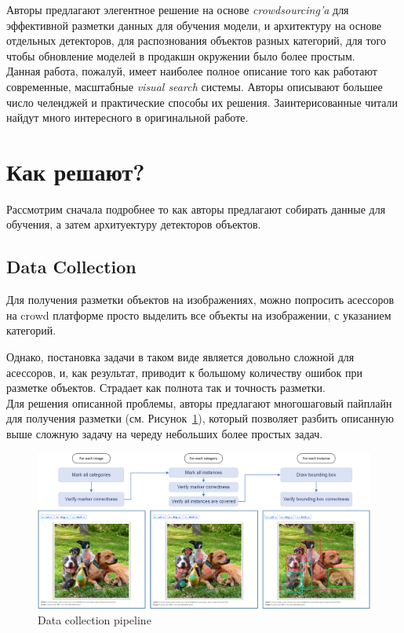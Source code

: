 Авторы предлагают элегентное решение на основе \textit{crowdsourcing'a} для эффективной разметки данных для обучения модели, и архитектуру на основе  отдельных детекторов, для распознования объектов разных категорий, для того чтобы обновление моделей в продакшн окружении было более простым. \\

Данная работа, пожалуй, имеет наиболее полное описание того как работают современные, масштабные \textit{visual search} системы.
Авторы описывают большее число челенджей и практические способы их решения.
Заинтерисованные читали найдут много интересного в оригинальной работе.

\section*{Как решают?}

Рассмотрим сначала подробнее то как авторы предлагают собирать данные для обучения, а затем архитуектуру детекторов объектов.

\subsection*{Data Collection}

Для получения разметки объектов на изображениях, можно попросить асессоров на crowd платформе просто выделить все объекты на изображении, с указанием категорий.

Однако, постановка задачи в таком виде является довольно сложной для асессоров, и, как результат, приводит к большому количеству ошибок при разметке объектов.
Страдает как полнота так и точность разметки. \\

Для решения описанной проблемы, авторы предлагают многошаговый пайплайн для получения разметки (см. Рисунок~\ref{fig:bing_data_collection}), который позволяет разбить описанную выше сложную задачу на череду небольших более простых задач.

\begin{figure}[ht]
  \centering
  \includegraphics[width=0.9\linewidth]{images/bing_data_collection.png}
  \caption{\footnotesize{Data collection pipeline}}
  \label{fig:bing_data_collection}
\end{figure}

